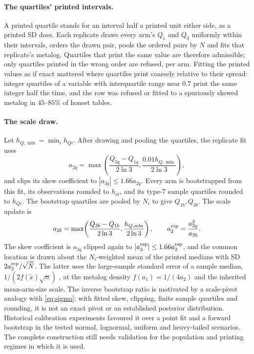 \documentclass[11pt,a4paper]{article}
\begin{document}
\paragraph{The quartiles' printed intervals.} A printed quartile stands for an interval half a printed unit either side, as a printed SD does. Each replicate draws every arm's $Q_1$ and $Q_3$ uniformly within their intervals, orders the drawn pair, pools the ordered pairs by $N$ and fits that replicate's metalog. Quartiles that print the same value are therefore admissible; only quartiles printed in the wrong order are refused, per arm. Fitting the printed values as if exact mattered where quartiles print coarsely relative to their spread: integer quartiles of a variable with interquartile range near $0.7$ print the same integer half the time, and the row was refused or fitted to a spuriously skewed metalog in $45$--$85\%$ of honest tables.

\paragraph{The scale draw.} Let $h_{Q,\min}=\min_i h_{Q i}$. After drawing and pooling the quartiles, the replicate fit uses
\begin{equation}
a_{2q}=\max\!\left(\frac{Q_{3q}-Q_{1q}}{2\ln3},\frac{0.01h_{Q,\min}}{2\ln3}\right),
\end{equation}
and clips its skew coefficient to $|a_{3q}|\le1.66a_{2q}$. Every arm is bootstrapped \citep{efron1979,efron1993} from this fit, its observations rounded to $h_{o i}$, and its type-7 sample quartiles \citep{hyndman1996} rounded to $h_{Q i}$. The bootstrap quartiles are pooled by $N_i$ to give $Q_{1b},Q_{3b}$. The scale update is
\begin{equation}
a_{2b}=\max\!\left(\frac{Q_{3b}-Q_{1b}}{2\ln3},\frac{h_{Q,\min}}{2\ln3}\right),\qquad
a_2^{\rm rep}=\frac{a_{2q}^2}{a_{2b}}.
\end{equation}
The skew coefficient is $a_{3q}$ clipped again to $|a_3^{\rm rep}|\le1.66a_2^{\rm rep}$, and the common location is drawn about the $N_i$-weighted mean of the printed medians with SD $2a_2^{\rm rep}/\sqrt{\bar N}$. The latter uses the large-sample standard error of a sample median, $1/(2f(\tilde x)\sqrt{n})$ \citep{cramer1946}, at the metalog density $f(a_1)=1/(4a_2)$ and the inherited mean-arm-size scale. The inverse bootstrap ratio is motivated by a scale-pivot analogy with \eqref{eq:sigma}; with fitted skew, clipping, finite sample quartiles and rounding, it is not an exact pivot or an established posterior distribution. Historical calibration experiments favoured it over a point fit and a forward bootstrap in the tested normal, lognormal, uniform and heavy-tailed scenarios. The complete construction still needs validation for the population and printing regimes in which it is used.
\end{document}
